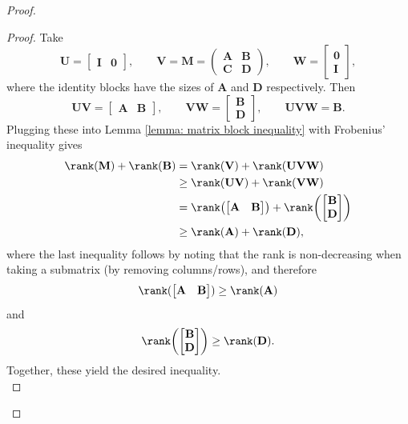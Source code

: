 \documentclass{article}
\theoremstyle{definition}
\let\originalleft\left
\let\originalright\right
\renewcommand{\left}{\mathopen{}\mathclose\bgroup\originalleft}
\renewcommand{\right}{\aftergroup\egroup\originalright}
\begin{document}
\begin{proof}
\begin{proof}
Take
\[
\mathbf{U}=\begin{bmatrix}\mathbf{I} & \mathbf{0}\end{bmatrix}, 
\qquad
\mathbf{V}=\mathbf{M}=\begin{pmatrix}\mathbf{A}&\mathbf{B}\\ \mathbf{C}&\mathbf{D}\end{pmatrix},
\qquad
\mathbf{W}=\begin{bmatrix}\mathbf{0}\\ \mathbf{I}\end{bmatrix},
\]
where the identity blocks have the sizes of $\mathbf{A}$ and $\mathbf{D}$ respectively.
Then
\[
\mathbf{UV}=\begin{bmatrix}\mathbf{A} & \mathbf{B}\end{bmatrix}, 
\qquad 
\mathbf{VW}=\begin{bmatrix}\mathbf{B}\\ \mathbf{D}\end{bmatrix},
\qquad
\mathbf{UVW} = \mathbf{B}.
\]
Plugging these into Lemma \ref{lemma: matrix block inequality} with Frobenius' inequality gives
\begin{align*}\rank(\mathbf{M}) + \rank(\mathbf{B}) &= \rank(\mathbf{V}) + \rank(\mathbf{UVW}) \\ &\geq \rank(\mathbf{UV}) + \rank(\mathbf{VW}) \\
&= \rank\left(\begin{bmatrix}\mathbf{A} & \mathbf{B}\end{bmatrix}\right) + 
\rank\left(\begin{bmatrix}\mathbf{B} \\ \mathbf{D}\end{bmatrix}\right) \\
&\geq \rank(\mathbf{A}) + \rank(\mathbf{D}),
\end{align*}
where the last inequality follows by noting that the rank is non-decreasing when taking a submatrix (by removing columns/rows), and therefore 
\[\rank(\begin{bmatrix}\mathbf{A} & \mathbf{B}\end{bmatrix}) \geq \rank(\mathbf{A})\] and \[\rank\left(\begin{bmatrix}\mathbf{B} \\ \mathbf{D}\end{bmatrix}\right) \geq \rank(\mathbf{D}).\]
Together, these yield the desired inequality.\qedhere\\
\end{proof}


\end{proof}
\end{document}
